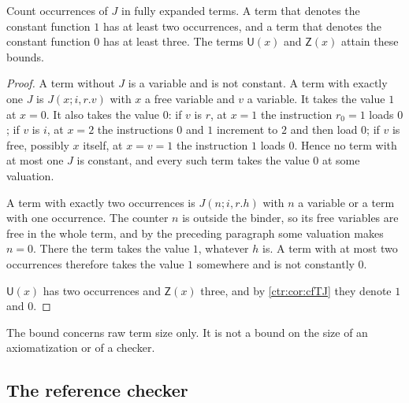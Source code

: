 \begin{proposition}\label{ctr:prop:cfsize}
Count occurrences of $J$ in fully expanded terms. A term that denotes the constant function
$1$ has at least two occurrences, and a term that denotes the constant function $0$ has at
least three. The terms $\mathsf U(x)$ and $\mathsf Z(x)$ attain these bounds.
\end{proposition}
\begin{proof}
A term without $J$ is a variable and is not constant. A term with exactly one $J$ is
$J(x;i,r.v)$ with $x$ a free variable and $v$ a variable. It takes the value $1$ at $x=0$.
It also takes the value $0$: if $v$ is $r$, at $x=1$ the instruction $r_0=1$ loads $0$; if
$v$ is $i$, at $x=2$ the instructions $0$ and $1$ increment to $2$ and then load $0$; if
$v$ is free, possibly $x$ itself, at $x=v=1$ the instruction $1$ loads $0$. Hence no term
with at most one $J$ is constant, and every such term takes the value $0$ at some valuation.

A term with exactly two occurrences is $J(n;i,r.h)$ with $n$ a variable or a term with one
occurrence. The counter $n$ is outside the binder, so its free variables are free in the
whole term, and by the preceding paragraph some valuation makes $n=0$. There the term takes
the value $1$, whatever $h$ is. A term with at most two occurrences therefore takes the
value $1$ somewhere and is not constantly $0$.

$\mathsf U(x)$ has two occurrences and $\mathsf Z(x)$ three, and by \cref{ctr:cor:cfTJ} they
denote $1$ and $0$.
\end{proof}

The bound concerns raw term size only. It is not a bound on the size of an axiomatization or
of a checker.

\subsection{The reference checker}

